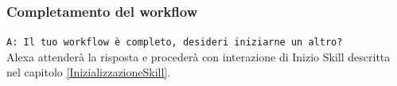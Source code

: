 \subsubsection{Completamento del workflow}
\texttt{A: Il tuo workflow è completo, desideri iniziarne un altro?}\\
Alexa attenderà la risposta e procederà con interazione di Inizio Skill descritta nel capitolo \ref{InizializzazioneSkill}.
